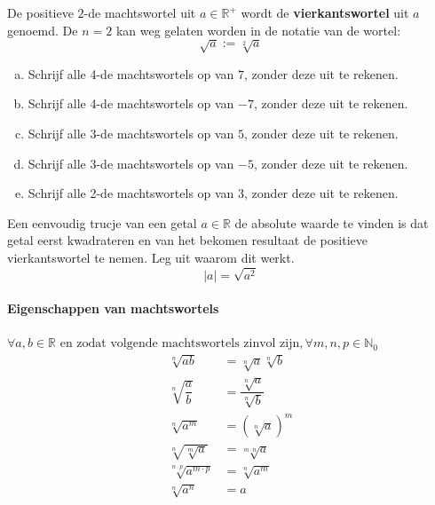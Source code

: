 \documentclass[12pt,twoside]{article}
\begin{document}
De positieve $2$-de machtswortel uit $a\in\mathbb{R}^+$ wordt de {\bf vierkantswortel} uit $a$ genoemd. De $n=2$ kan weg gelaten worden in de notatie van de wortel:
$$\sqrt{a}:=\sqrt[2]{a}$$

\begin{oefening}
\begin{enumerate}[(a)]
  \item Schrijf alle 4-de machtswortels op van $7$, zonder deze uit te rekenen.
  \item Schrijf alle 4-de machtswortels op van $-7$, zonder deze uit te rekenen.
  \item Schrijf alle 3-de machtswortels op van $5$, zonder deze uit te rekenen.
  \item Schrijf alle 3-de machtswortels op van $-5$, zonder deze uit te rekenen.
  \item Schrijf alle 2-de machtswortels op van $3$, zonder deze uit te rekenen.
\end{enumerate}
\end{oefening}

\begin{oefening}
Een eenvoudig trucje van een getal $a\in\mathbb{R}$ de absolute waarde te vinden is dat getal eerst kwadrateren en van het bekomen resultaat de positieve vierkantswortel te nemen. Leg uit waarom dit werkt.
$$|a| = \sqrt{a^2}$$
\end{oefening}


\paragraph*{Eigenschappen van machtswortels}
\begin{mdframed}
$\forall a, b \in\mathbb{R}\mbox{ en zodat volgende machtswortels zinvol zijn}, \forall m,n,p\in\mathbb{N}_0$
\begin{align*}
  \sqrt[n]{ab} &= \sqrt[n]{a}\sqrt[n]{b}\\
  \sqrt[n]{\dfrac{a}{b}} &= \dfrac{\sqrt[n]{a}}{\sqrt[n]{b}}\\
  \sqrt[n]{a^m} &= \left(\sqrt[n]{a}\right)^m\\
  \sqrt[n]{\sqrt[m]{a}} &= \sqrt[m\cdot n]{a}\\
  \sqrt[n\cdot p]{a^{m\cdot p}} &= \sqrt[n]{a^m}\\
  \sqrt[n]{a^n} &= a
\end{align*}
\end{mdframed}
\end{document}
